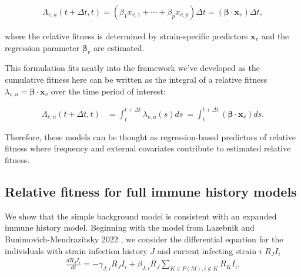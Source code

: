 \documentclass[12pt,oneside,letterpaper]{article}
\renewcommand{\vec}[1]{\boldsymbol{#1}}
\def\tbc#1{\textcolor{purple}{[#1]}}
\begin{document}
\begin{align*}
    \Lambda_{v,u}(t + \Delta t,t) = (\beta_{1} x_{v,1} + \cdots + \beta_{p} x_{v, p})\Delta t = (\vec{\beta} \cdot \vec{x}_{v}) \Delta t,
\end{align*}

where the relative fitness is determined by strain-specific predictors $\vec{x}_{v}$ and the regression parameter $\vec{\beta}_{v}$ are estimated.

This formulation fits neatly into the framework we've developed as the cumulative fitness here can be written as the integral of a relative fitness $\lambda_{v, u} =  \vec{\beta} \cdot \vec{x}_{v}$ over the time period of interest:

\begin{align*}
    \Lambda_{v,u}(t + \Delta t,t)  &= \int_{t}^{t+\Delta t} \lambda_{v,u}(s)ds\ = \int_{t}^{t + \Delta t} (\vec{\beta} \cdot \vec{x}_{v}) ds.
\end{align*}

Therefore, these models can be thought as regression-based predictors of relative fitness where frequency and external covariates contribute to estimated relative fitness.



\subsection{Relative fitness for full immune history models}\label{ssec:full_immune_history}


We show that the simple background model is consistent with an expanded immune history model.
Beginning with the model from Lazebnik and Bunimovich-Mendrazitsky 2022 \cite{Lazebnik2022}, we consider the differential equation for the individuals with strain infection history $J$ and current infecting strain $i$ $R_{J}I_{i}$
\begin{align*}
\frac{dR_{J} I_{i}}{dt} = - \gamma_{J, i} R_{J} I_{i} + \beta_{J, i} R_{J} \sum_{K \in P(M), i\notin K} R_{K}I_{i}.
\end{align*}
\end{document}
